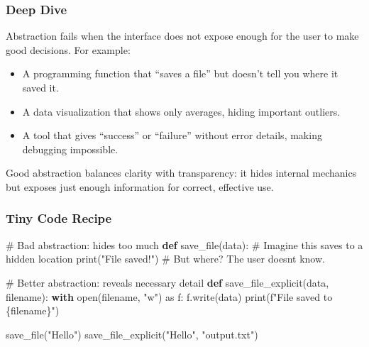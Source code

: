 \documentclass[
  letterpaper,
  DIV=11,
  numbers=noendperiod]{scrreprt}
\newenvironment{Shaded}{\begin{snugshade}}{\end{snugshade}}
\newcommand{\BuiltInTok}[1]{\textcolor[rgb]{0.00,0.23,0.31}{#1}}
\newcommand{\CommentTok}[1]{\textcolor[rgb]{0.37,0.37,0.37}{#1}}
\newcommand{\ControlFlowTok}[1]{\textcolor[rgb]{0.00,0.23,0.31}{\textbf{#1}}}
\newcommand{\ImportTok}[1]{\textcolor[rgb]{0.00,0.46,0.62}{#1}}
\newcommand{\KeywordTok}[1]{\textcolor[rgb]{0.00,0.23,0.31}{\textbf{#1}}}
\newcommand{\NormalTok}[1]{\textcolor[rgb]{0.00,0.23,0.31}{#1}}
\newcommand{\SpecialCharTok}[1]{\textcolor[rgb]{0.37,0.37,0.37}{#1}}
\newcommand{\SpecialStringTok}[1]{\textcolor[rgb]{0.13,0.47,0.30}{#1}}
\newcommand{\StringTok}[1]{\textcolor[rgb]{0.13,0.47,0.30}{#1}}
\providecommand{\tightlist}{%
  \setlength{\itemsep}{0pt}\setlength{\parskip}{0pt}}
\begin{document}
\subsubsection{Deep Dive}\label{deep-dive-16}

Abstraction fails when the interface does not expose enough for the user
to make good decisions. For example:

\begin{itemize}
\tightlist
\item
  A programming function that ``saves a file'' but doesn't tell you
  where it saved it.
\item
  A data visualization that shows only averages, hiding important
  outliers.
\item
  A tool that gives ``success'' or ``failure'' without error details,
  making debugging impossible.
\end{itemize}

Good abstraction balances clarity with transparency: it hides internal
mechanics but exposes just enough information for correct, effective
use.

\subsubsection{Tiny Code Recipe}\label{tiny-code-recipe-44}

\begin{Shaded}
\begin{Highlighting}[]
\CommentTok{\# Bad abstraction: hides too much}
\KeywordTok{def}\NormalTok{ save\_file(data):}
    \CommentTok{\# Imagine this saves to a hidden location}
    \BuiltInTok{print}\NormalTok{(}\StringTok{"File saved!"}\NormalTok{)  }\CommentTok{\# But where? The user doesn\textquotesingle{}t know.}

\CommentTok{\# Better abstraction: reveals necessary detail}
\KeywordTok{def}\NormalTok{ save\_file\_explicit(data, filename):}
    \ControlFlowTok{with} \BuiltInTok{open}\NormalTok{(filename, }\StringTok{"w"}\NormalTok{) }\ImportTok{as}\NormalTok{ f:}
\NormalTok{        f.write(data)}
    \BuiltInTok{print}\NormalTok{(}\SpecialStringTok{f"File saved to }\SpecialCharTok{\{}\NormalTok{filename}\SpecialCharTok{\}}\SpecialStringTok{"}\NormalTok{)}

\NormalTok{save\_file(}\StringTok{"Hello"}\NormalTok{)}
\NormalTok{save\_file\_explicit(}\StringTok{"Hello"}\NormalTok{, }\StringTok{"output.txt"}\NormalTok{)}
\end{Highlighting}
\end{Shaded}
\end{document}
